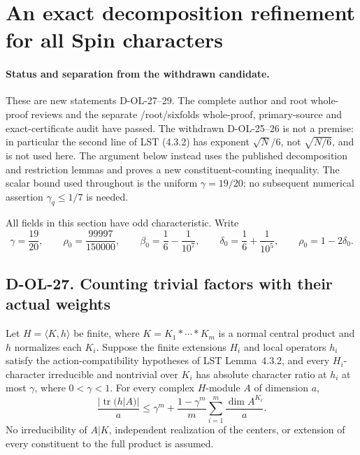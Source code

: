 \section{An exact decomposition refinement for all Spin characters}
\label{sec:spin-parameter-optimization}

\paragraph{Status and separation from the withdrawn candidate.}
These are new statements D-OL-27--29. The complete author and root
whole-proof reviews and the separate /root/sixfolds whole-proof,
primary-source and exact-certificate audit have passed.  The withdrawn D-OL-25--26 is not a premise:
in particular the second line of LST (4.3.2) has exponent
$\sqrt N/6$, not $\sqrt{N/6}$, and is not used here.
The argument below instead uses the published decomposition and
restriction lemmas and proves a new constituent-counting inequality.
The scalar bound used throughout is the uniform $\gamma=19/20$;
no subsequent numerical assertion $\gamma_q\le1/7$ is needed.

All fields in this section have odd characteristic.  Write
\[
 \gamma=\frac{19}{20},\qquad
 \rho_0=\frac{99997}{150000},\qquad
 \beta_0=\frac16-\frac1{10^7},\qquad
 \delta_0=\frac16+\frac1{10^5},\qquad \rho_0=1-2\delta_0.
 \tag{SPO.1}
\]

\subsection*{D-OL-27. Counting trivial factors with their actual weights}

\begin{lemma}[D-OL-27]
Let $H=\langle K,h\rangle$ be finite, where
$K=K_1*\cdots*K_m$ is a normal central product and $h$ normalizes
each $K_i$.  Suppose the finite extensions $H_i$ and local operators
$h_i$ satisfy the action-compatibility hypotheses of LST Lemma~4.3.2,
and every $H_i$-character irreducible and nontrivial over $K_i$ has
absolute character ratio at $h_i$ at most $\gamma$, where $0<\gamma<1$.
For every complex $H$-module $A$ of dimension $a$,
\[
 \frac{|\operatorname{tr}(h|A)|}{a}
 \le\gamma^m+
       \frac{1-\gamma^m}{m}
          \sum_{i=1}^m\frac{\dim A^{K_i}}a.
 \tag{SPO.2}
\]
No irreducibility of $A|K$, independent realization of the centers,
or extension of every constituent to the full product is assumed.
\end{lemma}

